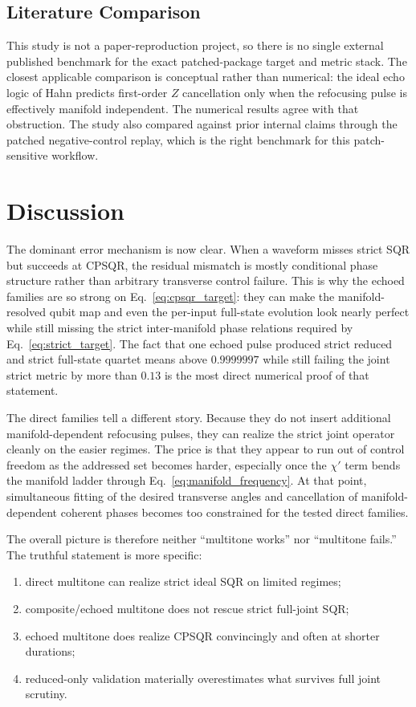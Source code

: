 \documentclass[aps,pra,twocolumn,reprint,floatfix,amsmath,amssymb]{revtex4-2}
\begin{document}
\subsection{Literature Comparison}
This study is not a paper-reproduction project, so there is no single external published benchmark for the exact patched-package target and metric stack. The closest applicable comparison is conceptual rather than numerical: the ideal echo logic of Hahn \cite{hahn1950echo} predicts first-order $Z$ cancellation only when the refocusing pulse is effectively manifold independent. The numerical results agree with that obstruction. The study also compared against prior internal claims through the patched negative-control replay, which is the right benchmark for this patch-sensitive workflow.

\section{Discussion}
The dominant error mechanism is now clear. When a waveform misses strict SQR but succeeds at CPSQR, the residual mismatch is mostly conditional phase structure rather than arbitrary transverse control failure. This is why the echoed families are so strong on Eq.~\eqref{eq:cpsqr_target}: they can make the manifold-resolved qubit map and even the per-input full-state evolution look nearly perfect while still missing the strict inter-manifold phase relations required by Eq.~\eqref{eq:strict_target}. The fact that one echoed pulse produced strict reduced and strict full-state quartet means above $0.9999997$ while still failing the joint strict metric by more than $0.13$ is the most direct numerical proof of that statement.

The direct families tell a different story. Because they do not insert additional manifold-dependent refocusing pulses, they can realize the strict joint operator cleanly on the easier regimes. The price is that they appear to run out of control freedom as the addressed set becomes harder, especially once the $\chi'$ term bends the manifold ladder through Eq.~\eqref{eq:manifold_frequency}. At that point, simultaneous fitting of the desired transverse angles and cancellation of manifold-dependent coherent phases becomes too constrained for the tested direct families.

The overall picture is therefore neither ``multitone works'' nor ``multitone fails.'' The truthful statement is more specific:
\begin{enumerate}
    \item direct multitone can realize strict ideal SQR on limited regimes;
    \item composite/echoed multitone does not rescue strict full-joint SQR;
    \item echoed multitone does realize CPSQR convincingly and often at shorter durations;
    \item reduced-only validation materially overestimates what survives full joint scrutiny.
\end{enumerate}
\end{document}
